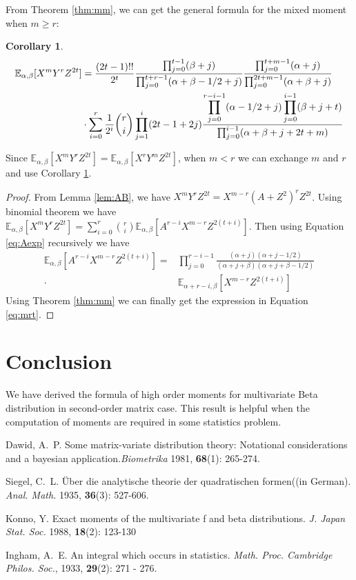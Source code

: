 \documentclass[mathpazo]{cmr}
\def\E{\mathbb{E}}
\newtheorem{cor}{Corollary}
\begin{document}
From Theorem \ref{thm:mm},
we can get
the general formula for the mixed moment when $m\geq r$:
\begin{cor}\label{cor:mr}
	\begin{align}
	\E_{\alpha, \beta}[X^mY^rZ^{2t}] &= \frac{(2t-1)!!}{2^t}
	\frac{\prod_{j=0}^{t-1} (\beta+j)}{\prod_{j=0}^{t+r-1} (\alpha+\beta-1/2+j)}
	\frac{\prod_{j=0}^{t+m-1}(\alpha+j)}{\prod_{j=0}^{2t+m-1} (\alpha+\beta+j)}\notag\\
	&\cdot\sum_{i=0}^r \frac{1}{2^i}\binom{r}{i}\prod_{j=1}^i (2t-1+2j)
	\frac{\displaystyle\prod_{j=0}^{r-i-1}(\alpha-1/2+j)
		\prod_{j=0}^{i-1}(\beta+j+t)}{\prod_{j=0}^{i-1}(\alpha+\beta+j+2t+m)}
	\label{eq:mrt}
	\end{align}
\end{cor}
Since $\E_{\alpha, \beta}[X^mY^rZ^{2t}]=\E_{\alpha, \beta}[X^rY^mZ^{2t}]$, 
when $m<r$ we can exchange $m$ and $r$ and use Corollary \ref{cor:mr}.
\begin{proof}
	From Lemma \ref{lem:AB}, we have
	$X^m Y^r Z^{2t} = X^{m-r}(A+Z^2)^r Z^{2t} $.
	Using binomial theorem we have
	$\E_{\alpha, \beta}[X^m Y^r Z^{2t}] = \sum_{i=0}^r \binom{r}{i}\E_{\alpha, \beta}
	[A^{r-i}X^{m-r}Z^{2(t+i)}]$. Then using Equation \eqref{eq:Aexp} recursively
	we have 
	\begin{align*}
	\E_{\alpha, \beta}
	[A^{r-i}X^{m-r}Z^{2(t+i)}] =&
	\prod_{j=0}^{r-i-1}\frac{(\alpha+j)(\alpha+j-1/2)}
	{(\alpha+j+\beta)(\alpha+j+\beta-1/2)} \\
	\cdot & \E_{\alpha+r-i, \beta}
	[X^{m-r}Z^{2(t+i)}]
	\end{align*}
	Using Theorem \ref{thm:mm} we can finally get the expression in
	Equation \eqref{eq:mrt}.
\end{proof}
\section{Conclusion}
We have derived the formula of high order moments for multivariate Beta distribution
in second-order matrix case. This result is helpful when the computation of moments
are required in some statistics problem.
%
%
\begin{thebibliography}{99}
 Dawid, A.~P. Some matrix-variate distribution theory: Notational
  considerations and a bayesian application.{\it Biometrika} 1981, {\bf 68}(1): 265-274.

 Siegel, C.~L. Über die analytische theorie der quadratischen formen((in German).
  {\it Anal. Math.} 1935, {\bf 36}(3): 527-606.

 Konno, Y. Exact moments of the multivariate f and beta distributions.
{\it J. Japan Stat. Soc.} 1988, {\bf 18}(2): 123-130

 Ingham, A.~E. An integral which occurs in statistics. {\it Math. Proc. Cambridge Philos. Soc.}, 1933, {\bf 29}(2): 271 - 276.
\end{thebibliography}
\end{document}
